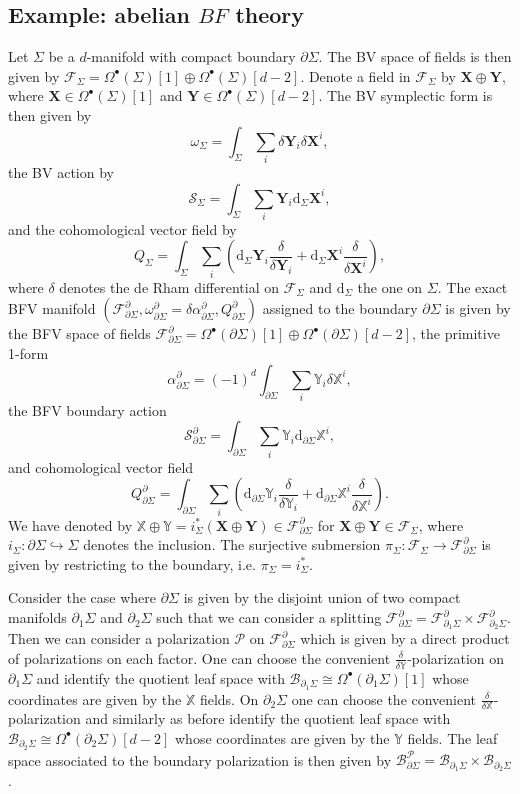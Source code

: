 \documentclass[11pt,colorinlistoftodos]{amsart}
\numberwithin{equation}{subsection}
\theoremstyle{plain}
\theoremstyle{definition}
\theoremstyle{remark}
\newcommand{\dd}{{\mathrm{d}}}
\newcommand{\de}{\partial}
\newcommand{\calB}{\mathcal{B}}
\newcommand{\calS}{\mathcal{S}}
\newcommand{\calP}{\mathcal{P}}
\newcommand{\calF}{\mathcal{F}}
\begin{document}
\subsection{Example: abelian $BF$ theory}
\label{subsec:abelian_BF_theory}
Let $\Sigma$ be a $d$-manifold with compact boundary $\de\Sigma$. The BV space of fields is then given by $\calF_\Sigma=\Omega^\bullet(\Sigma)[1]\oplus\Omega^\bullet(\Sigma)[d-2]$. Denote a field in $\calF_\Sigma$ by $\mathbf{X}\oplus\mathbf{Y}$, where $\mathbf{X}\in \Omega^\bullet(\Sigma)[1]$ and $\mathbf{Y}\in \Omega^\bullet(\Sigma)[d-2]$. The BV symplectic form is then given by 
\[
\omega_\Sigma=\int_\Sigma\sum_i\delta\mathbf{Y}_i\delta\mathbf{X}^i,
\]
the BV action by 
\[
\calS_\Sigma=\int_\Sigma\sum_i\mathbf{Y}_i\dd_\Sigma\mathbf{X}^i,
\]
and the cohomological vector field by 
\[
Q_\Sigma=\int_\Sigma\sum_i\left(\dd_\Sigma\mathbf{Y}_i\frac{\delta}{\delta\mathbf{Y}_i}+\dd_\Sigma\mathbf{X}^i\frac{\delta}{\delta\mathbf{X}^i}\right),
\]
where $\delta$ denotes the de Rham differential on $\calF_\Sigma$ and $\dd_\Sigma$ the one on $\Sigma$.
The exact BFV manifold $(\calF^\de_{\de\Sigma},\omega^\de_{\de\Sigma}=\delta\alpha^\de_{\de\Sigma},Q^\de_{\de\Sigma})$ assigned to the boundary $\de\Sigma$ is given by the BFV space of fields $\calF^\de_{\de\Sigma}=\Omega^\bullet(\de\Sigma)[1]\oplus\Omega^\bullet(\de\Sigma)[d-2]$, the primitive 1-form
\[
\alpha^\de_{\de\Sigma}=(-1)^d\int_{\de\Sigma}\sum_i\mathds{Y}_i\delta\mathds{X}^i,
\]
the BFV boundary action
\[
\calS^\de_{\de\Sigma}=\int_{\de\Sigma}\sum_i\mathds{Y}_i\dd_{\de\Sigma}\mathds{X}^i,
\]
and cohomological vector field
\[
Q^\de_{\de\Sigma}=\int_{\de\Sigma}\sum_i\left(\dd_{\de\Sigma}\mathds{Y}_i\frac{\delta}{\delta\mathds{Y}_i}+\dd_{\de\Sigma}\mathds{X}^i\frac{\delta}{\delta\mathds{X}^i}\right).
\]
We have denoted by $\mathds{X}\oplus\mathds{Y}=i_\Sigma^*(\mathbf{X}\oplus\mathbf{Y})\in \calF^\de_{\de\Sigma}$ for $\mathbf{X}\oplus\mathbf{Y}\in \calF_\Sigma$, where $i_\Sigma\colon \de\Sigma\hookrightarrow \Sigma$ denotes the inclusion. The surjective submersion $\pi_\Sigma\colon \calF_\Sigma\to \calF^\de_{\de\Sigma}$ is given by restricting to the boundary, i.e. $\pi_\Sigma=i_\Sigma^*$. 

Consider the case where $\de\Sigma$ is given by the disjoint union of two compact manifolds $\de_1\Sigma$ and $\de_2\Sigma$ such that we can consider a splitting $\calF^\de_{\de\Sigma}=\calF^{\de}_{\de_1\Sigma}\times \calF^\de_{\de_2\Sigma}$. Then we can consider a polarization $\calP$ on $\calF^\de_{\de\Sigma}$ which is given by a direct product of polarizations on each factor. One can choose the convenient $\frac{\delta}{\delta\mathds{Y}}$-polarization on $\de_1\Sigma$ and identify the quotient leaf space with $\calB_{\de_1\Sigma}\cong\Omega^\bullet(\de_1\Sigma)[1]$ whose coordinates are given by the $\mathds{X}$ fields. On $\de_2\Sigma$ one can choose the convenient $\frac{\delta}{\delta\mathds{X}}$-polarization and similarly as before identify the quotient leaf space with $\calB_{\de_2\Sigma}\cong\Omega^\bullet(\de_2\Sigma)[d-2]$ whose coordinates are given by the $\mathds{Y}$ fields. The leaf space associated to the boundary polarization is then given by $\calB^\calP_{\de\Sigma}=\calB_{\de_1\Sigma}\times \calB_{\de_2\Sigma}$. 
\end{document}
